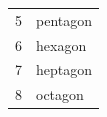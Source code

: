 \begin{table}[H]
{{\begin{center}
\begin{tabular}[t]{|l|l|}
    
        5 &
    
    
        pentagon%
     \tabularnewline\cline{1-1}\cline{2-2}
    
    
        6 &
    
    
        hexagon%
     \tabularnewline\cline{1-1}\cline{2-2}
    
    
        7 &
    
    
        heptagon%
     \tabularnewline\cline{1-1}\cline{2-2}
    
    
        8 &
    
    
        octagon%
     \tabularnewline\cline{1-1}\cline{2-2}
    

\end{tabular}
\end{center}}}
\end{table}

